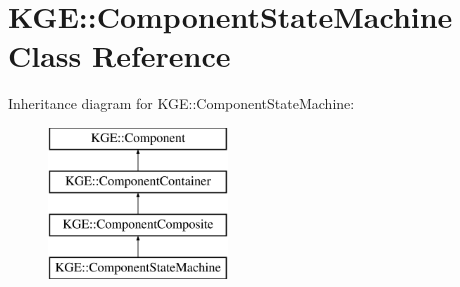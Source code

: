 \hypertarget{class_k_g_e_1_1_component_state_machine}{\section{K\-G\-E\-:\-:Component\-State\-Machine Class Reference}
\label{class_k_g_e_1_1_component_state_machine}
}
Inheritance diagram for K\-G\-E\-:\-:Component\-State\-Machine\-:\begin{figure}[H]
\begin{center}
\leavevmode
\includegraphics[height=4.000000cm]{class_k_g_e_1_1_component_state_machine}
\end{center}
\end{figure}
